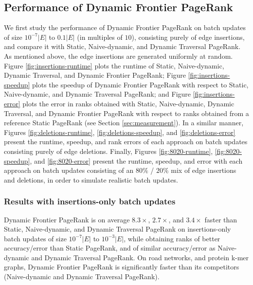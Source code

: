 







\subsection{Performance of Dynamic Frontier PageRank}

We first study the performance of Dynamic Frontier PageRank on batch updates of size $10^{-7}|E|$ to $0.1|E|$ (in multiples of $10$), consisting purely of edge insertions, and compare it with Static, Naive-dynamic, and Dynamic Traversal PageRank. As mentioned above, the edge insertions are generated uniformly at random. Figure \ref{fig:insertions-runtime} plots the runtime of Static, Naive-dynamic, Dynamic Traversal, and Dynamic Frontier PageRank; Figure \ref{fig:insertions-speedup} plots the speedup of Dynamic Frontier PageRank with respect to Static, Naive-dynamic, and Dynamic Traversal PageRank; and Figure \ref{fig:insertions-error} plots the error in ranks obtained with Static, Naive-dynamic, Dynamic Traversal, and Dynamic Frontier PageRank with respect to ranks obtained from a reference Static PageRank (see Section \ref{sec:measurement}). In a similar manner, Figures \ref{fig:deletions-runtime}, \ref{fig:deletions-speedup}, and \ref{fig:deletions-error} present the runtime, speedup, and rank errors of each approach on batch updates consisting purely of edge deletions. Finally, Figures \ref{fig:8020-runtime}, \ref{fig:8020-speedup}, and \ref{fig:8020-error} present the runtime, speedup, and error with each approach on batch updates consisting of an $80\%$ / $20\%$ mix of edge insertions and deletions, in order to simulate realistic batch updates.


\subsubsection{Results with insertions-only batch updates}

Dynamic Frontier PageRank is on average $8.3\times$, $2.7\times$, and $3.4\times$ faster than Static, Naive-dynamic, and Dynamic Traversal PageRank on insertions-only batch updates of size $10^{-7}|E|$ to $10^{-3}|E|$, while obtaining ranks of better accuracy/error than Static PageRank, and of similar accuracy/error as Naive-dynamic and Dynamic Traversal PageRank. On road networks, and protein k-mer graphs, Dynamic Frontier PageRank is significantly faster than its competitors (Naive-dynamic and Dynamic Traversal PageRank).


